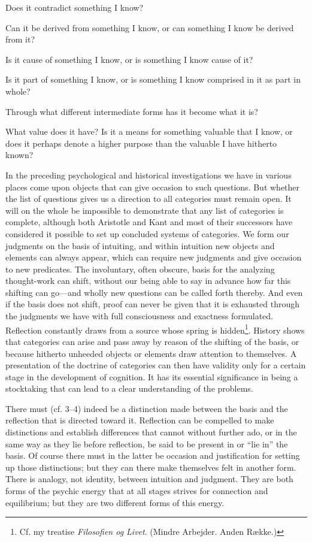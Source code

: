 \documentclass[12pt,a4paper]{book}
\newcommand{\opage}[1]{\marginnote{\footnotesize\textit{[#1]}}}
\begin{document}
\opage{138}Does it contradict something I know?

Can it be derived from something I know, or can something I know be derived
from it?

Is it cause of something I know, or is something I know cause of it?

Is it part of something I know, or is something I know comprised in it as
part in whole?

Through what different intermediate forms has it become what it is?

What value does it have? Is it a means for something valuable that I know,
or does it perhaps denote a higher purpose than the valuable I have hitherto
known?

In the preceding psychological and historical investigations we have in
various places come upon objects that can give occasion to such questions.
But whether the list of questions gives us a direction to all categories
must remain open. It will on the whole be impossible to demonstrate that any
list of categories is complete, although both Aristotle and Kant and most
of their successors have considered it possible to set up concluded systems
of categories. We form our judgments on the basis of intuiting, and within
intuition new objects and elements can always appear, which can require new
judgments and give occasion to new predicates. The involuntary, often
obscure, basis for the analyzing thought-work can shift, without our being
able to say in advance how far this shifting can go---and wholly new
questions can be called forth thereby. And even if the basis does not shift,
proof can never be given that it is exhausted through the judgments we have
with full consciousness and exactness formulated. Reflection constantly
draws from a source whose spring is hidden\footnote{Cf. my treatise
\emph{Filosofien og Livet}. (Mindre Arbejder. Anden Række.)}. History shows
that categories can arise and pass away by reason of the shifting of the
basis, or because hitherto unheeded objects or elements draw attention to
themselves. A presentation of the doctrine of categories can then have
validity only for a certain stage in the development of cognition. It has
its essential significance in \opage{139}being a stocktaking that can lead to a clear
understanding of the problems.

There must (cf. 3--4) indeed be a distinction made between the basis and
the reflection that is directed toward it. Reflection can be compelled to
make distinctions and establish differences that cannot without further
ado, or in the same way as they lie before reflection, be said to be
present in or ``lie in'' the basis. Of course there must in the latter be
occasion and justification for setting up those distinctions; but they can
there make themselves felt in another form. There is analogy, not identity,
between intuition and judgment. They are both forms of the psychic energy
that at all stages strives for connection and equilibrium; but they are two
different forms of this energy.
\end{document}
